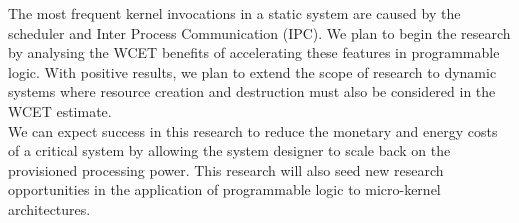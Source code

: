 \documentclass[10pt]{article}
\begin{document}
The most frequent kernel invocations in a static system are caused by the scheduler and Inter Process
Communication (IPC). We plan to begin the research by analysing the WCET benefits of accelerating these
features in programmable logic. With positive results, we plan to extend the scope of research to dynamic
systems where resource creation and destruction must also be considered in the WCET estimate.
\\

We can expect success in this research to reduce the monetary and energy costs of a critical system by
allowing the system designer to scale back on the provisioned processing power. This research will also
seed new research opportunities in the application of programmable logic to micro-kernel architectures.
\end{document}
